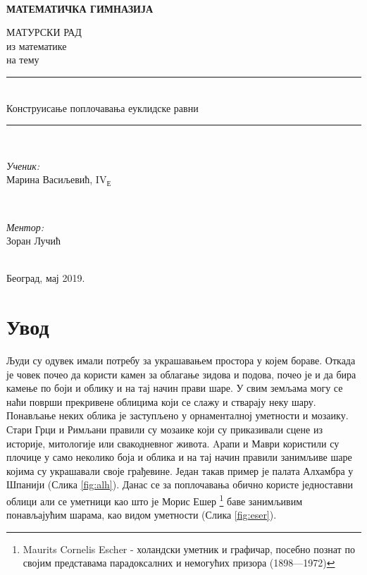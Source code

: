 \documentclass[12pt]{article}
\begin{document}
\newcommand{\HRule}{\rule{\linewidth}{0.5mm}} %

\thispagestyle{empty}
\\
\centerline{\LARGE \textbf{МАТЕМАТИЧКА ГИМНАЗИЈА}}

\vspace*{40mm}
\begin{center}
{\Large МАТУРСКИ РАД}\\
{\Large из математике}\\
{\Large	на тему}
\Huge\HRule\\[0.4cm] %
	{Конструисање поплочавања еуклидске равни}\\
	\HRule \\[20pt] %
\begin{minipage}{0.4\textwidth}
\begin{flushleft} \large
\emph{\Large Ученик:}\\
{\Large Марина Васиљевић}, IV$_\text{Е}$\\
\end{flushleft}
\end{minipage}
~
\begin{minipage}{0.4\textwidth}
\begin{flushright} \large
\vspace{0.5cm}
\emph{\Large Ментор:} \\
{\Large Зоран Лучић}\\ 
\end{flushright}
\end{minipage}\\[8cm]
\Large{Београд, мај 2019.}
\end{center}

\tableofcontents

\thispagestyle{empty}

\clearpage
\setcounter{page}{1}

\section{Увод}
Људи су одувек имали потребу за украшавањем простора у којем бораве.  Откада је човек почео да користи камен за облагање зидова и подова, почео је и да бира камење по боји и облику и на тај начин прави шаре.
У свим земљама могу се наћи површи прекривене облицима који се слажу и стварају неку шару. Понављање неких облика је заступљено у орнаменталној уметности и мозаику.
Стари Грци и Римљани правили су мозаике који су приказивали сцене из историје, митологије или свакодневног живота. Aрапи и Маври користили су плочице у само неколико боја и облика и на тај начин правили занимљиве шаре којима су украшавали своје грађевине. Један такав пример је палата Алхамбра у Шпанији (Слика \ref{fig:alh}). Данас се за поплочавања обично користе једноставни облици али се уметници као што је Морис Ешер \footnote{Maurits Cornelis Escher - холандски уметник и графичар, посебно познат по својим представама парадоксалних и немогућих призора (1898—1972)} баве занимљивим понављајућим шарама, као видом уметности (Слика \ref{fig:eser}).
\end{document}
